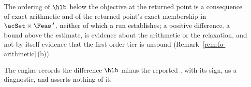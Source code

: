 
The ordering of $\hlb$ below the objective at the returned point is a
consequence of exact arithmetic and of the returned point's exact
membership in $\acSet\times\Feas^{J}$, neither of which a run establishes;
a positive difference, a bound above the estimate, is evidence about the
arithmetic or the relaxation, and not by itself evidence that the
first-order tier is unsound (Remark~\ref{rem:fo-arithmetic}\,(b)).

\begin{requirement}\label{req:bound-estimate-difference}
The engine records the difference $\hlb$ minus the reported
, with its sign, as a diagnostic, and asserts nothing of it.
\end{requirement}
